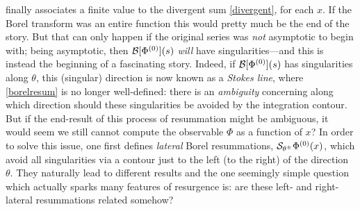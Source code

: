 \documentclass[11pt,a4paper]{article}
\newcommand{\CB}{{\cal B}}
\newcommand{\CS}{{\cal S}}
\begin{document}
finally associates a finite value to the divergent sum \eqref{divergent}, for each $x$. If the Borel transform was an entire function this would pretty much be the end of the story. But that can only happen if the original series was \textit{not} asymptotic to begin with; being asymptotic, then $\CB [\Phi^{(0)}] (s)$ \textit{will} have singularities---and this is instead the beginning of a fascinating story. Indeed, if $\CB [\Phi^{(0)}] (s)$ has singularities along $\theta$, this (singular) direction is now known as a \textit{Stokes line}, where \eqref{borelresum} is no longer well-defined: there is an \textit{ambiguity} concerning along which direction should these singularities be avoided by the  integration contour. But if the end-result of this process of resummation might be ambiguous, it would seem we still cannot compute the observable $\Phi$ as a function of $x$? In order to solve this issue, one first defines \textit{lateral} Borel resummations, $\CS_{\theta^{\pm}} \Phi^{(0)} (x)$, which avoid all singularities via a contour just to the left (to the right) of the direction $\theta$. They naturally lead to different results and the one seemingly simple question which actually sparks many features of resurgence is: are these left- and right-lateral resummations related somehow?
\end{document}
